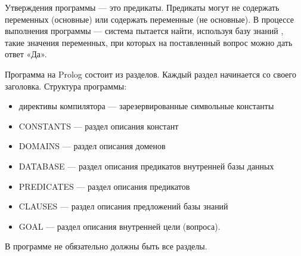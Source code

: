 Утверждения программы — это предикаты. Предикаты могут не содержать переменных
(основные) или содержать переменные (не основные). В процессе выполнения программы —
система пытается найти, используя базу знаний , такие значения переменных, при которых на
поставленный вопрос можно дать ответ «Да».

Программа на Prolog состоит из разделов. Каждый раздел начинается со своего
заголовка. Структура программы:
\begin{itemize}
	\item директивы компилятора — зарезервированные символьные константы
	\item CONSTANTS — раздел описания констант
	\item DOMAINS — раздел описания доменов
	\item DATABASE — раздел описания предикатов внутренней базы данных
	\item PREDICATES — раздел описания предикатов
	\item CLAUSES — раздел описания предложений базы знаний
	\item GOAL — раздел описания внутренней цели (вопроса).
\end{itemize}

В программе не обязательно должны быть все разделы.
